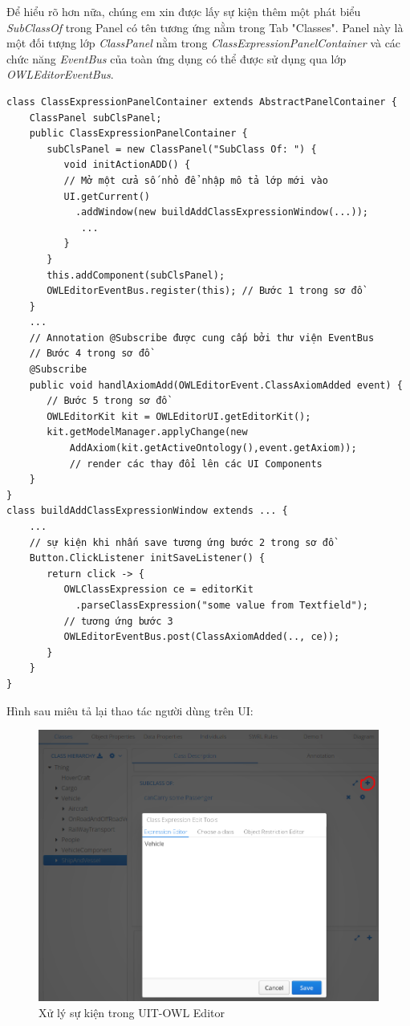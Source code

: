 Để hiểu rõ hơn nữa, chúng em xin được lấy sự kiện thêm một phát biểu \textit{SubClassOf} trong Panel có tên tương ứng nằm trong Tab "Classes". Panel này là một đối tượng lớp \textit{ClassPanel} nằm trong \textit{ClassExpressionPanelContainer} và các chức năng \textit{EventBus} của toàn ứng dụng có thể được sử dụng qua lớp \textit{OWLEditorEventBus}. 
\begin{verbatim}
class ClassExpressionPanelContainer extends AbstractPanelContainer {
    ClassPanel subClsPanel; 
    public ClassExpressionPanelContainer {
       subClsPanel = new ClassPanel("SubClass Of: ") {
          void initActionADD() { 
          // Mở một cửa số nhỏ để nhập mô tả lớp mới vào
          UI.getCurrent()
            .addWindow(new buildAddClassExpressionWindow(...));            
             ...
          }
       }
       this.addComponent(subClsPanel); 
	   OWLEditorEventBus.register(this); // Bước 1 trong sơ đồ
    }
    ...
    // Annotation @Subscribe được cung cấp bởi thư viện EventBus
    // Bước 4 trong sơ đồ 
    @Subscribe 
    public void handlAxiomAdd(OWLEditorEvent.ClassAxiomAdded event) {
       // Bước 5 trong sơ đồ
       OWLEditorKit kit = OWLEditorUI.getEditorKit();
       kit.getModelManager.applyChange(new 
           AddAxiom(kit.getActiveOntology(),event.getAxiom));
	       // render các thay đổi lên các UI Components
    }  
}
class buildAddClassExpressionWindow extends ... {
    ...
    // sự kiện khi nhấn save tương ứng bước 2 trong sơ đồ
    Button.ClickListener initSaveListener() {
       return click -> {
          OWLClassExpression ce = editorKit
            .parseClassExpression("some value from Textfield");
          // tương ứng bước 3 
          OWLEditorEventBus.post(ClassAxiomAdded(.., ce));
       }
    }
}
\end{verbatim}
Hình sau miêu tả lại thao tác người dùng trên UI:
\begin{figure}[h!]
	\centering
	\includegraphics[width=145mm]{Figures/eventBusExplain.png}
	\caption{Xử lý sự kiện trong UIT-OWL Editor\label{overflow}}
\end{figure}

